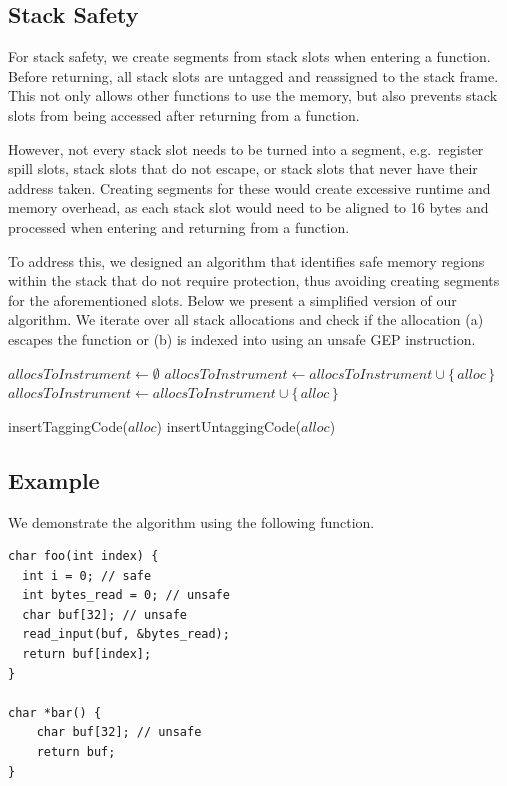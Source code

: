 \subsection{Stack Safety}
\label{subsec:stack-safety}

For stack safety, we create segments from stack slots when entering a function.
Before returning, all stack slots are untagged and reassigned to the stack frame.
This not only allows other functions to use the memory, but also prevents stack slots from being accessed after returning from a function.

However, not every stack slot needs to be turned into a segment, e.g.\ register spill slots, stack slots that do not escape, or stack slots that never have their address taken.
Creating segments for these would create excessive runtime and memory overhead, as each stack slot would need to be aligned to 16 bytes and processed when entering and returning from a function.

To address this, we designed an algorithm that identifies safe memory regions within the stack that do not require protection, thus avoiding creating segments for the aforementioned slots.
Below we present a simplified version of our algorithm.
We iterate over all stack allocations and check if the allocation (a) escapes the function or (b) is indexed into using an unsafe \ac{GEP} instruction.

\begin{algorithmic}
    \State $allocsToInstrument \gets \emptyset$
            \State $allocsToInstrument \gets allocsToInstrument \cup \{\,alloc\,\}$
            \State $allocsToInstrument \gets allocsToInstrument \cup \{\,alloc\,\}$
        \EndIf
    \EndFor

        \State insertTaggingCode($alloc$)
        \State insertUntaggingCode($alloc$)
    \EndFor
\end{algorithmic}

\subsection{Example}
\label{subsec:example2}

We demonstrate the algorithm using the following function.

\begin{lstlisting}[frame=h,style=customc,
    label={lst:stack-safety}]
char foo(int index) {
  int i = 0; // safe
  int bytes_read = 0; // unsafe
  char buf[32]; // unsafe
  read_input(buf, &bytes_read);
  return buf[index];
}

char *bar() {
    char buf[32]; // unsafe
    return buf;
}
\end{lstlisting}

